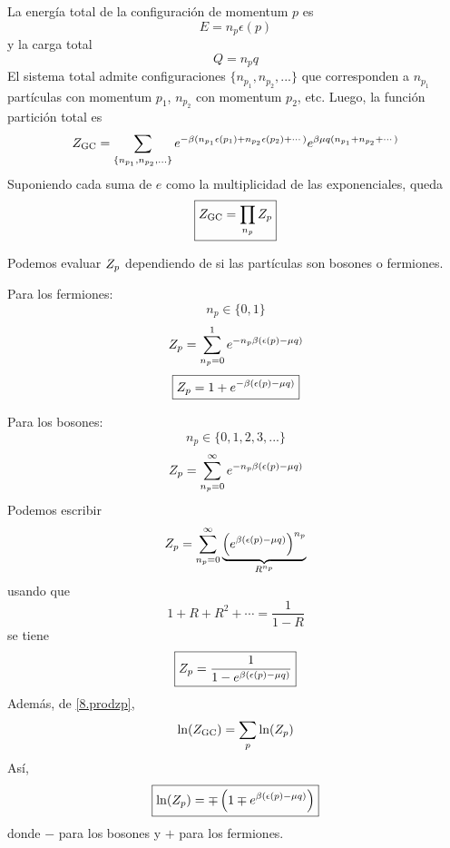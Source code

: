 La energía total de la configuración de momentum $p$ es
\begin{equation}
  E=n_p \epsilon(p)
\end{equation}
y la carga total
\begin{equation}
  Q=n_pq
\end{equation}
El sistema total admite configuraciones $\{n_{p_1},n_{p_2},...\}$ que corresponden a $n_{p_1}$ partículas con momentum $p_1$, $n_{p_2}$ con momentum $p_2$, etc. Luego, la función partición total es
\begin{equation}
  Z_{\rm GC} =\sum_{\{n_{p_1},n_{p_2},...\}}e^{-\beta (n_{p_1}\epsilon(p_1)+n_{p_2}\epsilon(p_2)+\cdots)}e^{\beta\mu q(n_{p_1}+n_{p_2}+\cdots)}
\end{equation}
Suponiendo cada suma de $e$ como la multiplicidad de las exponenciales, queda
\begin{equation}\label{8.prodzp}
  \boxed{Z_{\rm GC} =\prod_{n_p} Z_{p}}
\end{equation}

Podemos evaluar $Z_{p}$ dependiendo de si las partículas son bosones o fermiones.

Para los fermiones:
\begin{equation}
  n_p\in \{0,1\}
\end{equation}
\begin{equation}
  Z_{p}=\sum_{n_p=0}^1e^{-n_p\beta (\epsilon(p)-\mu q)}
\end{equation}
\begin{equation}
 \boxed{ Z_{p}=1+e^{-\beta (\epsilon(p)-\mu q)}}
\end{equation}

Para los bosones:
\begin{equation}
   n_p\in \{0,1,2,3,...\}
\end{equation}
\begin{equation}
  Z_{p}=\sum_{n_p=0}^\infty e^{-n_p\beta (\epsilon(p)-\mu q)}
\end{equation}
Podemos escribir
\begin{equation}
  Z_{p} =\sum_{n_p=0}^\infty \underbrace{\left(e^{\beta (\epsilon(p)-\mu q)}\right)^{n_p}}_{R^{n_p}}
\end{equation}
usando que
\begin{equation}
  1+R+R^2+\cdots =\frac{1}{1-R}
\end{equation}
se tiene
\begin{equation}
  \boxed{Z_{p}=\frac{1}{1-e^{\beta (\epsilon(p)-\mu q)}}}
\end{equation}
Además, de \eqref{8.prodzp}, 
\begin{equation}
  \ln(Z_{\rm GC})=\sum_p\ln(Z_{p})
\end{equation}
Así,
\begin{equation}
  \boxed{\ln(Z_{p})=\mp \left(1\mp e^{\beta (\epsilon(p)-\mu q)}\right)}
\end{equation}
donde $-$ para los bosones y $+$ para los fermiones.

